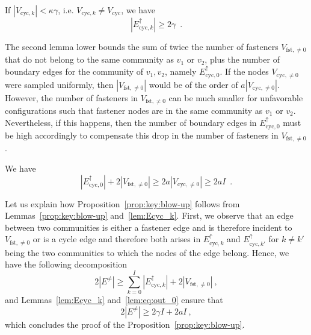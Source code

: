 \documentclass[final]{colt2026}
\newcommand{\1}{\mathbf{1}}
\begin{document}
\begin{lemma}\label{lem:Ecyc_k}
If $|V_{\mathrm{cyc},k}| < \kappa \gamma$, i.e. $V_{\mathrm{cyc},k}\neq V_{\mathrm{cyc}}$, we have 
\[
|E_{\mathrm{cyc},k}^{\uparrow}|\geq 2\gamma\enspace . 
\]
\end{lemma}
The second lemma lower bounds the sum of twice the number of fasteners $V_{\mathrm{fst},\neq 0}$ that do not belong to the same community as $v_1$ or $v_2$, plus the number of boundary edges for the community of $v_1,v_2$, namely $E_{\mathrm{cyc},0}^{\uparrow}$. If the nodes $V_{\mathrm{cyc},\neq 0}$ were sampled uniformly, then $|V_{\mathrm{fst},\neq 0}|$ would be of the order of $a|V_{\mathrm{cyc},\neq 0}|$. However, the number of fasteners in $V_{\mathrm{fst},\neq 0}$ can be much smaller for unfavorable configurations such that fastener nodes are in the same community as $v_1$ or $v_2$. Nevertheless, if this happens, then the number of boundary edges in $E_{\mathrm{cyc},0}^{\uparrow}$ must be high accordingly to compensate this drop in the number of fasteners in $V_{\mathrm{fst},\neq 0}$. %
\begin{lemma}\label{lem:eq:out_0}
    We have 
 \begin{equation}\label{eq:objective_fastener}
|E_{\mathrm{cyc},0}^{\uparrow}|+ 2 |V_{\mathrm{fst},\neq 0}| \geq 2 a |V_{\mathrm{cyc},\neq 0}| \geq 2a I\enspace . 
\end{equation}
\end{lemma}

Let us explain how Proposition~\ref{prop:key:blow-up} follows from Lemmas~\ref{prop:key:blow-up} and~\ref{lem:Ecyc_k}.
First, we observe that  an edge between two communities is either a fastener edge and is therefore incident to $V_{\mathrm{fst}, \neq 0}$ or is a cycle edge and therefore both arises in $E_{\mathrm{cyc},k}^{\uparrow}$ and $E_{\mathrm{cyc},k'}^{\uparrow}$ for $k\neq k'$ being the two communities to which the nodes of the edge belong.
Hence, we have the following decomposition
\[
2|E^{\neq}|\geq \sum_{k=0}^{I} |E_{\mathrm{cyc},k}^{\uparrow}| + 2|V_{\mathrm{fst}, \neq 0}|\ ,
\]
and  Lemmas~\ref{lem:Ecyc_k} and~\ref{lem:eq:out_0} ensure  that 
\[
2|E^{\neq}|\geq 2\gamma I + 2a I \ , 
\]
which concludes the proof of the Proposition~\ref{prop:key:blow-up}.
\end{document}

